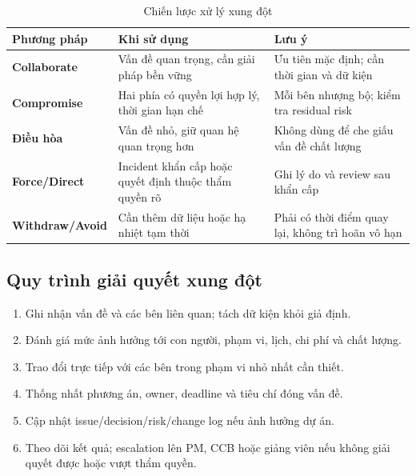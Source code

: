 \begin{table}[H]
\centering
\caption{Chiến lược xử lý xung đột}
\label{tab:conflict-strategy}
\begin{tabularx}{\textwidth}{| >{\bfseries}p{3.2cm} | p{5cm} | X |}
\hline
Phương pháp & Khi sử dụng & Lưu ý \\
\hline
Collaborate & Vấn đề quan trọng, cần giải pháp bền vững & Ưu tiên mặc định; cần thời gian và dữ kiện \\ \hline
Compromise & Hai phía có quyền lợi hợp lý, thời gian hạn chế & Mỗi bên nhượng bộ; kiểm tra residual risk \\ \hline
Điều hòa & Vấn đề nhỏ, giữ quan hệ quan trọng hơn & Không dùng để che giấu vấn đề chất lượng \\ \hline
Force/Direct & Incident khẩn cấp hoặc quyết định thuộc thẩm quyền rõ & Ghi lý do và review sau khẩn cấp \\ \hline
Withdraw/Avoid & Cần thêm dữ liệu hoặc hạ nhiệt tạm thời & Phải có thời điểm quay lại, không trì hoãn vô hạn \\
\hline
\end{tabularx}
\end{table}

\subsection{Quy trình giải quyết xung đột}

\begin{enumerate}
  \item Ghi nhận vấn đề và các bên liên quan; tách dữ kiện khỏi giả định.
  \item Đánh giá mức ảnh hưởng tới con người, phạm vi, lịch, chi phí và chất lượng.
  \item Trao đổi trực tiếp với các bên trong phạm vi nhỏ nhất cần thiết.
  \item Thống nhất phương án, owner, deadline và tiêu chí đóng vấn đề.
  \item Cập nhật issue/decision/risk/change log nếu ảnh hưởng dự án.
  \item Theo dõi kết quả; escalation lên PM, CCB hoặc giảng viên nếu không giải quyết được hoặc vượt thẩm quyền.
\end{enumerate}


